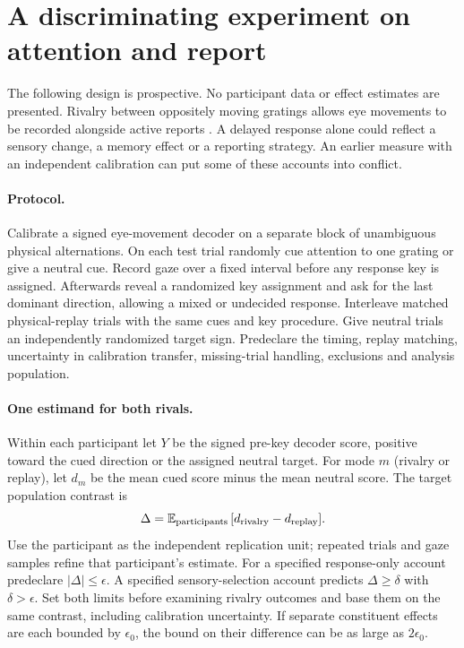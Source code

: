 \section{A discriminating experiment on attention and report}
The following design is prospective. No participant data or effect estimates are presented. Rivalry between oppositely moving gratings allows eye movements to be recorded alongside active reports \citep{frassle2014rivalry}. A delayed response alone could reflect a sensory change, a memory effect or a reporting strategy. An earlier measure with an independent calibration can put some of these accounts into conflict.

\paragraph{Protocol.}
Calibrate a signed eye-movement decoder on a separate block of unambiguous physical alternations. On each test trial randomly cue attention to one grating or give a neutral cue. Record gaze over a fixed interval before any response key is assigned. Afterwards reveal a randomized key assignment and ask for the last dominant direction, allowing a mixed or undecided response. Interleave matched physical-replay trials with the same cues and key procedure. Give neutral trials an independently randomized target sign. Predeclare the timing, replay matching, uncertainty in calibration transfer, missing-trial handling, exclusions and analysis population.

\paragraph{One estimand for both rivals.}
Within each participant let $Y$ be the signed pre-key decoder score, positive toward the cued direction or the assigned neutral target. For mode $m$ (rivalry or replay), let $d_m$ be the mean cued score minus the mean neutral score. The target population contrast is
\[
 \Delta=\mathbb E_{\rm participants}\,[d_{\rm rivalry}-d_{\rm replay}] .
\]
Use the participant as the independent replication unit; repeated trials and gaze samples refine that participant's estimate. For a specified response-only account predeclare $|\Delta|\le\epsilon$. A specified sensory-selection account predicts $\Delta\ge\delta$ with $\delta>\epsilon$. Set both limits before examining rivalry outcomes and base them on the same contrast, including calibration uncertainty. If separate constituent effects are each bounded by $\epsilon_0$, the bound on their difference can be as large as $2\epsilon_0$.

